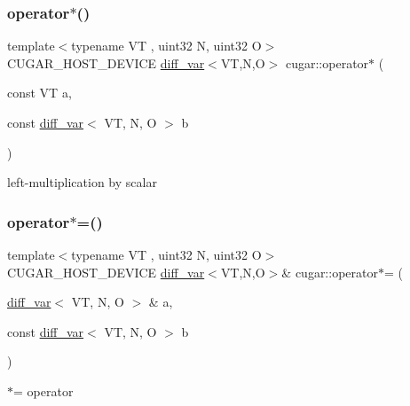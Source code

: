\subsubsection{\texorpdfstring{operator$\ast$()}{operator*()}\hspace{0.1cm}{\footnotesize\ttfamily [3/3]}}
{\footnotesize\ttfamily template$<$typename VT , uint32 N, uint32 O$>$ \\
C\+U\+G\+A\+R\+\_\+\+H\+O\+S\+T\+\_\+\+D\+E\+V\+I\+CE \hyperlink{structcugar_1_1diff__var}{diff\+\_\+var}$<$VT,N,O$>$ cugar\+::operator$\ast$ (\begin{DoxyParamCaption}\item[{const VT}]{a,  }\item[{const \hyperlink{structcugar_1_1diff__var}{diff\+\_\+var}$<$ VT, N, O $>$}]{b }\end{DoxyParamCaption})\hspace{0.3cm}{\ttfamily [inline]}}

left-\/multiplication by scalar \mbox{\label{group___auto_diff_module_ga46821702fe79221bbcde83e9bd2bff20}} 
\subsubsection{\texorpdfstring{operator$\ast$=()}{operator*=()}}
{\footnotesize\ttfamily template$<$typename VT , uint32 N, uint32 O$>$ \\
C\+U\+G\+A\+R\+\_\+\+H\+O\+S\+T\+\_\+\+D\+E\+V\+I\+CE \hyperlink{structcugar_1_1diff__var}{diff\+\_\+var}$<$VT,N,O$>$\& cugar\+::operator$\ast$= (\begin{DoxyParamCaption}\item[{\hyperlink{structcugar_1_1diff__var}{diff\+\_\+var}$<$ VT, N, O $>$ \&}]{a,  }\item[{const \hyperlink{structcugar_1_1diff__var}{diff\+\_\+var}$<$ VT, N, O $>$}]{b }\end{DoxyParamCaption})\hspace{0.3cm}{\ttfamily [inline]}}

$\ast$= operator \mbox{\label{group___auto_diff_module_ga47d435fca613a46396a9d551d12b7f16}} 
